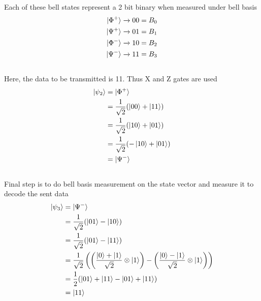 \documentclass[12pt]{article}
\begin{document}
  Each of these bell states represent a 2 bit binary when measured under bell basis\\
  \begin{equation*}
    \begin{split}
      \ket{\Phi^+} \xrightarrow{} 00 = B_0\\
      \ket{\Psi^+} \xrightarrow{} 01 = B_1\\
      \ket{\Phi^-} \xrightarrow{} 10 = B_2\\
      \ket{\Psi^-} \xrightarrow{} 11 = B_3
    \end{split}
  \end{equation*}\\
  Here, the data to be transmitted is 11. Thus X and Z gates are used\\
  \begin{equation*}
    \begin{split}
      \ket{\psi_2} & = \ket{\Phi^+}\\
      & = \frac{1}{\sqrt{2}}(\ket{00} + \ket{11})\\
      & = \frac{1}{\sqrt{2}}(\ket{10} + \ket{01})\\
      & = \frac{1}{\sqrt{2}}(-\ket{10} + \ket{01})\\
      & = \ket{\Psi^-}
    \end{split}
  \end{equation*}\\
  Final step is to do bell basis measurement on the state vector and measure it to decode the sent data\\
  \begin{equation*}
    \begin{split}
      \ket{\psi_3} & = \ket{\Psi^-}\\
      & = \frac{1}{\sqrt{2}}(\ket{01} - \ket{10})\\
      & = \frac{1}{\sqrt{2}}(\ket{01} - \ket{11})\\
      & = \frac{1}{\sqrt{2}} \left( \left( \frac{\ket{0} + \ket{1}}{\sqrt{2}} \otimes \ket{1} \right) - \left( \frac{\ket{0} - \ket{1}}{\sqrt{2}} \otimes \ket{1} \right) \right)\\
      & = \frac{1}{2}(\ket{01} + \ket{11} - \ket{01} + \ket{11})\\
      & = \ket{11}
    \end{split}
  \end{equation*}\\
\end{document}
